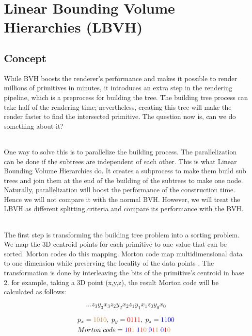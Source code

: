\documentclass[11pt,a4paper]{article}
\begin{document}
\clearpage

\section{Linear Bounding Volume Hierarchies (LBVH)}
\subsection{Concept}
While BVH boosts the renderer's performance and makes it possible to render millions of primitives in minutes, it introduces an extra step in the rendering pipeline, which is a preprocess for building the tree. The building tree process can take half of the rendering time; nevertheless, creating this tree will make the render faster to find the intersected primitive. The question now is, can we do something about it? 

\noindent
\\
One way to solve this is to parallelize the building process. The parallelization can be done if the subtrees are independent of each other. This is what Linear Bounding Volume Hierarchies do. It creates a subprocess to make them build sub trees and join them at the end of the building of the subtrees to make one node. Naturally, parallelization will boost the performance of the construction time. Hence we will not compare it with the normal BVH. However, we will treat the LBVH as different splitting criteria and compare its performance with the BVH.

\noindent
\\
The first step is transforming the building tree problem into a sorting problem. We map the 3D centroid points for each primitive to one value that can be sorted. Morton codes do this mapping. Morton code map multidimensional data to one dimension while preserving the locality of the data points \protect\cite{wikipedia2022}. The transformation is done by interleaving the bits of the primitive's centroid in base 2. for example, taking a 3D point (x,y,z), the result Morton code will be calculated as follows: 
 
\begin{equation}
 ...z_3y_3x_3z_2y_2x_2z_1y_1x_1z_0y_0x_0
\end{equation}

\begin{align*}
& p_x = \textcolor{brown}{1010}, \;p_y = \textcolor{red}{0111}, \;p_z = \textcolor{blue}{1100} \\
&Morton\;code = \textcolor{blue}{1}\textcolor{red}{0}\textcolor{brown}{1} \;\textcolor{blue}{1}\textcolor{red}{1}\textcolor{brown}{0} \;\textcolor{blue}{0}\textcolor{red}{1}\textcolor{brown}{1} \;\textcolor{blue}{0}\textcolor{red}{1}\textcolor{brown}{0}
\end{align*}
\end{document}
